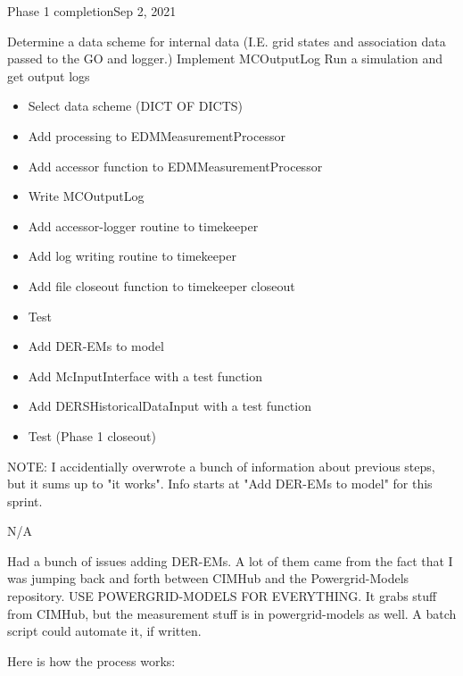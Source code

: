 \begin{entry}{Phase 1 completion}{Sep 2, 2021}
    \objective 
    
    Determine a data scheme for internal data (I.E. grid states and association data passed to the GO and logger.)
    Implement MCOutputLog
    Run a simulation and get output logs


    \outline

    \begin{itemize}
        \item Select data scheme (DICT OF DICTS)
        \item Add processing to EDMMeasurementProcessor
        \item Add accessor function to EDMMeasurementProcessor
        \item Write MCOutputLog
        \item Add accessor-logger routine to timekeeper
        \item Add log writing routine to timekeeper
        \item Add file closeout function to timekeeper closeout
        \item Test
        \item Add DER-EMs to model
        \item Add McInputInterface with a test function
        \item Add DERSHistoricalDataInput with a test function
        \item Test (Phase 1 closeout)

    \end{itemize}

    \procedures

    NOTE: I accidentially overwrote a bunch of information about previous steps, but it sums up to "it works". Info
    starts at "Add DER-EMs to model" for this sprint.


    \parameters
    
    N/A

    \observations

    Had a bunch of issues adding DER-EMs. A lot of them came from the fact that I was jumping back and forth between
    CIMHub and the Powergrid-Models repository. USE POWERGRID-MODELS FOR EVERYTHING. It grabs stuff from CIMHub, but the
    measurement stuff is in powergrid-models as well. A batch script could automate it, if written.

    Here is how the process works:


\end{entry}
